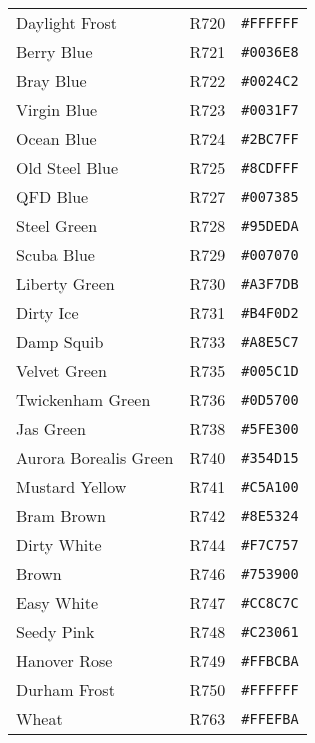 \documentclass[a4paper]{article}
\begin{document}
\begin{longtable}{|l|l|r|}
Daylight Frost & R720 & \texttt{\#FFFFFF} \cellcolor[HTML]{FFFFFF} \\
Berry Blue & R721 & \texttt{\#0036E8} \cellcolor[HTML]{0036E8} \\
Bray Blue & R722 & \texttt{\#0024C2} \cellcolor[HTML]{0024C2} \\
Virgin Blue & R723 & \texttt{\#0031F7} \cellcolor[HTML]{0031F7} \\
Ocean Blue & R724 & \texttt{\#2BC7FF} \cellcolor[HTML]{2BC7FF} \\
Old Steel Blue & R725 & \texttt{\#8CDFFF} \cellcolor[HTML]{8CDFFF} \\
QFD Blue & R727 & \texttt{\#007385} \cellcolor[HTML]{007385} \\
Steel Green & R728 & \texttt{\#95DEDA} \cellcolor[HTML]{95DEDA} \\
Scuba Blue & R729 & \texttt{\#007070} \cellcolor[HTML]{007070} \\
Liberty Green & R730 & \texttt{\#A3F7DB} \cellcolor[HTML]{A3F7DB} \\
Dirty Ice & R731 & \texttt{\#B4F0D2} \cellcolor[HTML]{B4F0D2} \\
Damp Squib & R733 & \texttt{\#A8E5C7} \cellcolor[HTML]{A8E5C7} \\
Velvet Green & R735 & \texttt{\#005C1D} \cellcolor[HTML]{005C1D} \\
Twickenham Green & R736 & \texttt{\#0D5700} \cellcolor[HTML]{0D5700} \\
Jas Green & R738 & \texttt{\#5FE300} \cellcolor[HTML]{5FE300} \\
Aurora Borealis Green & R740 & \texttt{\#354D15} \cellcolor[HTML]{354D15} \\
Mustard Yellow & R741 & \texttt{\#C5A100} \cellcolor[HTML]{C5A100} \\
Bram Brown & R742 & \texttt{\#8E5324} \cellcolor[HTML]{8E5324} \\
Dirty White & R744 & \texttt{\#F7C757} \cellcolor[HTML]{F7C757} \\
Brown  & R746 & \texttt{\#753900} \cellcolor[HTML]{753900} \\
Easy White & R747 & \texttt{\#CC8C7C} \cellcolor[HTML]{CC8C7C} \\
Seedy Pink & R748 & \texttt{\#C23061} \cellcolor[HTML]{C23061} \\
Hanover Rose & R749 & \texttt{\#FFBCBA} \cellcolor[HTML]{FFBCBA} \\
Durham Frost & R750 & \texttt{\#FFFFFF} \cellcolor[HTML]{FFFFFF} \\
Wheat & R763 & \texttt{\#FFEFBA} \cellcolor[HTML]{FFEFBA} \\

\end{longtable}
\end{document}
